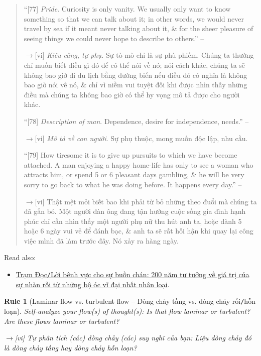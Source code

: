 \documentclass[12pt,twoside]{book}
\newtheorem{Rule}{Rule}
\begin{document}
\begin{quote}
	``[77] {\it Pride}. Curiosity is only vanity. We usually only want to know something so that we can talk about it; in other words, we would never travel by sea if it meant never talking about it, \& for the sheer pleasure of seeing things we could never hope to describe to others.'' -- \cite[IV. Boredom]{Pascal_pensees}
	
	{\sf[en]$\to$[vi]} {\it Kiêu căng, tự phụ.} Sự tò mò chỉ là sự phù phiếm. Chúng ta thường chỉ muốn biết điều gì đó để có thể nói về nó; nói cách khác, chúng ta sẽ không bao giờ đi du lịch bằng đường biển nếu điều đó có nghĩa là không bao giờ nói về nó, \& chỉ vì niềm vui tuyệt đối khi được nhìn thấy những điều mà chúng ta không bao giờ có thể hy vọng mô tả được cho người khác.
	
	``[78] {\it Description of man}. Dependence, desire for independence, needs.'' -- \cite[IV. Boredom]{Pascal_pensees}
	
	{\sf[en]$\to$[vi]} {\it Mô tả về con người}. Sự phụ thuộc, mong muốn độc lập, nhu cầu.
		
	``[79] How tiresome it is to give up pursuits to which we have become attached. A man enjoying a happy home-life has only to see a woman who attracts him, or spend 5 or 6 pleasant days gambling, \& he will be very sorry to go back to what he was doing before. It happens every day.'' -- \cite[IV. Boredom]{Pascal_pensees}
	
	{\sf[en]$\to$[vi]} Thật mệt mỏi biết bao khi phải từ bỏ những theo đuổi mà chúng ta đã gắn bó. Một người đàn ông đang tận hưởng cuộc sống gia đình hạnh phúc chỉ cần nhìn thấy một người phụ nữ thu hút anh ta, hoặc dành 5 hoặc 6 ngày vui vẻ để đánh bạc, \& anh ta sẽ rất hối hận khi quay lại công việc mình đã làm trước đây. Nó xảy ra hàng ngày.
\end{quote}
Read also:
\begin{itemize}
	\item \href{https://tramdoc.vn/tin-tuc/loi-benh-vuc-cho-su-buon-chan-200-nam-tu-tuong-ve-gia-tri-cua-su-nhan-roi-tu-nhung-bo-oc-vi-dai-nhat-nhan-loai-nnlAW.html}{Trạm Đọc{\tt/}Lời bênh vực cho sự buồn chán: 200 năm tư tưởng về giá trị của sự nhàn rỗi từ những bộ óc vĩ đại nhất nhân loại}.
\end{itemize}

\begin{Rule}[Laminar flow vs. turbulent flow -- Dòng chảy tầng vs. dòng chảy rối{\tt/}hỗn loạn]
	Self-analyze your flow(s) of thought(s): Is that flow laminar or turbulent? Are these flows laminar or turbulent?
	
	{\sf[en]$\to$[vi]} Tự phân tích (các) dòng chảy (các) suy nghĩ của bạn: Liệu dòng chảy đó là dòng chảy tầng hay dòng chảy hỗn loạn?
\end{Rule}
\end{document}
